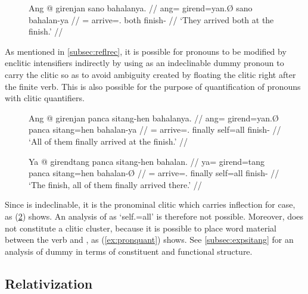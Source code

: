 \begin{figure}[t]
\ex\label{ex:freequantplcmt}
\begingl
	\gla Ang @ girenjan sano bahalanya. //
	\glb ang= girend=yan.Ø sano bahalan-ya //
	\glc \AgtT{}= arrive=\TplM{}.\Aarg{} both finish-\Loc{} //
	\glft `They arrived both at the finish.' //
\endgl\xe
\end{figure}

As mentioned in \autoref{subsec:reflrec}, it is possible for pronouns to be
modified by enclitic intensifiers indirectly by using
 as an indeclinable dummy pronoun to carry the clitic
so as to avoid ambiguity created by floating the clitic right after the finite
verb. This is also possible for the purpose of quantification of pronouns with
clitic quantifiers.

\begin{figure}[h]
\pex\label{ex:pronquant}
\a\label{ex:pronquant_1}\begingl
	\gla Ang @ girenjan panca sitang-hen bahalanya. //
	\glb ang= girend=yan.Ø panca sitang=hen bahalan-ya //
	\glc \AgtT{}= arrive=\TplM{}.\Aarg{} finally self=all finish-\Loc{} //
	\glft `All of them finally arrived at the finish.' //
\endgl

\a\label{ex:pronquant_2}\begingl
	\gla Ya @ girendtang panca sitang-hen bahalan. //
	\glb ya= girend=tang panca sitang=hen bahalan-Ø //
	\glc \LocT{}= arrive=\TplM{}.\Aarg{} finally self=all finish-\Top{} //
	\glft `The finish, all of them finally arrived there.' //
\endgl
\xe
\end{figure}

Since  is indeclinable, it is the pronominal clitic which
carries inflection for case, as (\ref{ex:pronquant_2}) shows. An analysis of
 as `self.\Top{}=all' is therefore not possible.
Moreover,  does not constitute a clitic
cluster, because it is possible to place word material between the verb and
, as (\ref{ex:pronquant}) shows. See
\autoref{subsec:expsitang} for an analysis of dummy  in
terms of constituent and functional structure.


\subsection{Relativization}
\label{subsec:relz}

